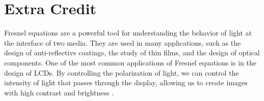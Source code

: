 \documentclass[10pt]{article}
\begin{document}
\section{Extra Credit}

Fresnel equations are a powerful tool for understanding the behavior of light at the interface of two media. They are used in many applications, such as the design of anti-reflective coatings, the study of thin films, and the design of optical components. One of the most common applications of Fresnel equations is in the design of LCDs. By controlling the polarization of light, we can control the intensity of light that passes through the display, allowing us to create images with high contrast and brightness \cite{dePooter_2002}.

\printbibliography
\end{document}
